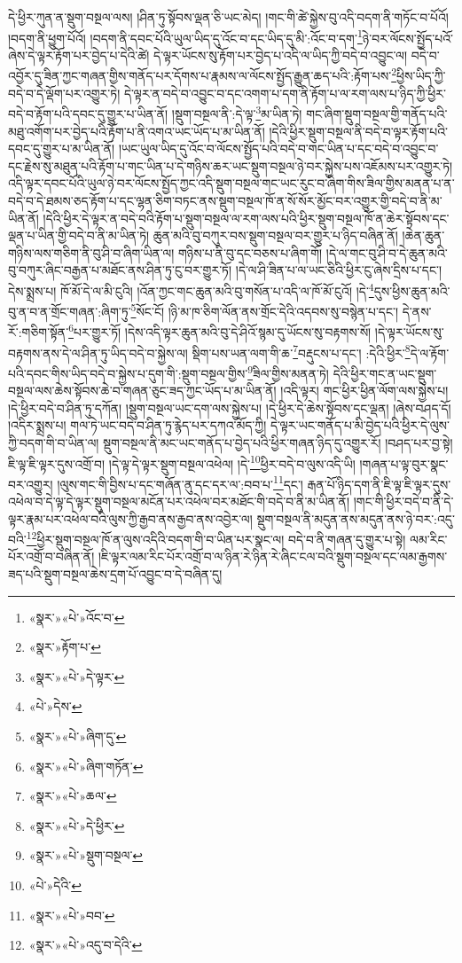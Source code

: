 དེ་ཕྱིར་ཀུན་ན་སྡུག་བསྔལ་ལས། །ཤིན་ཏུ་སྟོབས་ལྡན་ཅི་ཡང་མེད། །གང་གི་ཚེ་སྐྱེས་བུ་འདི་བདག་ནི་གཏོང་བ་པོའོ། །བདག་ནི་ཕྱུག་པོའོ། །བདག་ནི་དབང་པོའི་ཡུལ་ཡིད་དུ་འོང་བ་དང་ཡིད་དུ་མི་:འོང་བ་དག་\footnote{«སྣར་»«པེ་»འོང་བ་}ཉེ་བར་ལོངས་སྤྱོད་པའོ་ཞེས་དེ་ལྟར་རྟོག་པར་བྱེད་པ་དེའི་ཚེ། དེ་ལྟར་ཡོངས་སུ་རྟོག་པར་བྱེད་པ་འདི་ལ་ཡིད་ཀྱི་བདེ་བ་འབྱུང་ལ། བདེ་བ་འབྱོར་དུ་ཟིན་ཀྱང་གཞན་གྱིས་གནོད་པར་དོགས་པ་རྣམས་ལ་ལོངས་སྤྱོད་རྒྱུན་ཆད་པའི་:རྟོག་པས་\footnote{«སྣར་»རྟོག་པ་}ཕྱིས་ཡིད་ཀྱི་བདེ་བ་དེ་ལྡོག་པར་འགྱུར་ཏེ། དེ་ལྟར་ན་བདེ་བ་འབྱུང་བ་དང་འགག་པ་དག་ནི་རྟོག་པ་ལ་རག་ལས་པ་ཉིད་ཀྱི་ཕྱིར་བདེ་བ་རྟོག་པའི་དབང་དུ་གྱུར་པ་ཡིན་ནོ། །སྡུག་བསྔལ་ནི་:དེ་ལྟ་\footnote{«སྣར་»«པེ་»དེ་ལྟར་}མ་ཡིན་ཏེ། གང་ཞིག་སྡུག་བསྔལ་གྱི་གནོད་པའི་མཐུ་འགོག་པར་བྱེད་པའི་རྟོག་པ་ནི་འགའ་ཡང་ཡོད་པ་མ་ཡིན་ནོ། །དེའི་ཕྱིར་སྡུག་བསྔལ་ནི་བདེ་བ་ལྟར་རྟོག་པའི་དབང་དུ་གྱུར་པ་མ་ཡིན་ནོ། །ཡང་ཡུལ་ཡིད་དུ་འོང་བ་ལོངས་སྤྱོད་པའི་བདེ་བ་གང་ཡིན་པ་དང་བདེ་བ་འབྱུང་བ་དང་རྗེས་སུ་མཐུན་པའི་རྟོག་པ་གང་ཡིན་པ་དེ་གཉིས་ཆར་ཡང་སྡུག་བསྔལ་ཉེ་བར་སྐྱེས་པས་འཇོམས་པར་འགྱུར་ཏེ། འདི་ལྟར་དབང་པོའི་ཡུལ་ཉེ་བར་ལོངས་སྤྱོད་ཀྱང་འདི་སྡུག་བསྔལ་གང་ཡང་རུང་བ་ཞིག་གིས་ཟིལ་གྱིས་མནན་པ་ན་བདེ་བ་དེ་ཐམས་ཅད་རྟོག་པ་དང་ལྷན་ཅིག་བཏང་ནས་སྡུག་བསྔལ་ཁོ་ན་སོ་སོར་མྱོང་བར་འགྱུར་གྱི་བདེ་བ་ནི་མ་ཡིན་ནོ། །དེའི་ཕྱིར་དེ་ལྟར་ན་བདེ་བའི་རྟོག་པ་སྡུག་བསྔལ་ལ་རག་ལས་པའི་ཕྱིར་སྡུག་བསྔལ་ཁོ་ན་ཆེར་སྟོབས་དང་ལྡན་པ་ཡིན་གྱི་བདེ་བ་ནི་མ་ཡིན་ཏེ། ཆུན་མའི་བུ་བཀུར་བས་སྡུག་བསྔལ་བར་གྱུར་པ་ཉིད་བཞིན་ནོ། །ཆེན་ཆུན་གཉིས་ལས་གཅིག་ནི་བུ་ཤི་བ་ཞིག་ཡིན་ལ། གཉིས་པ་ནི་བུ་དང་བཅས་པ་ཞིག་གོ། །དེ་ལ་གང་བུ་ཤི་བ་དེ་ཆུན་མའི་བུ་བཀུར་ཞིང་བརྒྱན་པ་མཐོང་ནས་ཤིན་ཏུ་ངུ་བར་གྱུར་ཏོ། །དེ་ལ་ཤི་ཟིན་པ་ལ་ཡང་ཅིའི་ཕྱིར་ངུ་ཞེས་དྲིས་པ་དང་། དེས་སྨྲས་པ། ཁོ་མོ་དེ་ལ་མི་ངུའི། །འོན་ཀྱང་གང་ཆུན་མའི་བུ་གསོན་པ་འདི་ལ་ཁོ་མོ་ངུའོ། །དེ་\footnote{«པེ་»དེས་}དུས་ཕྱིས་ཆུན་མའི་བུ་ན་བ་ན་གྲོང་གཞན་:ཞིག་ཏུ་\footnote{«སྣར་»«པེ་»ཞིག་དུ་}སོང་ངོ། །ཉི་མ་ཁ་ཅིག་ལོན་ནས་གྲོང་དེའི་འདབས་སུ་བསྙེན་པ་དང་། དེ་ནས་རོ་:གཅིག་སྟོན་\footnote{«སྣར་»«པེ་»ཞིག་གཏོན་}པར་གྱུར་ཏོ། །དེས་འདི་ལྟར་ཆུན་མའི་བུ་དེ་ཤིའོ་སྙམ་དུ་ཡོངས་སུ་བརྟགས་སོ། །དེ་ལྟར་ཡོངས་སུ་བརྟགས་ནས་དེ་ལ་ཤིན་ཏུ་ཡིད་བདེ་བ་སྐྱེས་ལ། སྡིག་པས་ཡན་ལག་གི་ཆ་\footnote{«སྣར་»«པེ་»ཆལ་}བརྡུངས་པ་དང་། :དེའི་ཕྱིར་\footnote{«སྣར་»«པེ་»དེ་ཕྱིར་}དེ་ལ་རྟོག་པའི་དབང་གིས་ཡིད་བདེ་བ་སྐྱེས་པ་དུག་གི་:སྡུག་བསྔལ་གྱིས་\footnote{«སྣར་»«པེ་»སྡུག་བསྔལ་}ཟིལ་གྱིས་མནན་ཏེ། དེའི་ཕྱིར་གང་ན་ཡང་སྡུག་བསྔལ་ལས་ཆེས་སྟོབས་ཆེ་བ་གཞན་ཅུང་ཟད་ཀྱང་ཡོད་པ་མ་ཡིན་ནོ། །འདི་ལྟར། གང་ཕྱིར་ཕྱིན་ལོག་ལས་སྐྱེས་པ། །དེ་ཕྱིར་བདེ་བ་ཤིན་ཏུ་དཀོན། །སྡུག་བསྔལ་ཡང་དག་ལས་སྐྱེས་པ། །དེ་ཕྱིར་དེ་ཆེས་སྟོབས་དང་ལྡན། །ཞེས་བཤད་དོ། །འདིར་སྨྲས་པ། གལ་ཏེ་ཡང་བདེ་བ་ཤིན་ཏུ་རྙེད་པར་དཀའ་མོད་ཀྱི། དེ་ལྟར་ཡང་གནོད་པ་མི་བྱེད་པའི་ཕྱིར་དེ་ལུས་ཀྱི་བདག་གི་བ་ཡིན་ལ། སྡུག་བསྔལ་ནི་མང་ཡང་གནོད་པ་བྱེད་པའི་ཕྱིར་གཞན་ཉིད་དུ་འགྱུར་རོ། །བཤད་པར་བྱ་སྟེ། ཇི་ལྟ་ཇི་ལྟར་དུས་འགྲོ་བ། །དེ་ལྟ་དེ་ལྟར་སྡུག་བསྔལ་འཕེལ། །དེ་\footnote{«པེ་»དེའི་}ཕྱིར་བདེ་བ་ལུས་འདི་ཡི། །གཞན་པ་ལྟ་བུར་སྣང་བར་འགྱུར། །ལུས་གང་གི་བྱིས་པ་དང་གཞོན་ནུ་དང་དར་ལ་:བབ་པ་\footnote{«སྣར་»«པེ་»བབ་}དང་། རྒན་པོ་ཉིད་དག་ནི་ཇི་ལྟ་ཇི་ལྟར་དུས་འཕེལ་བ་དེ་ལྟ་དེ་ལྟར་སྡུག་བསྔལ་མངོན་པར་འཕེལ་བར་མཐོང་གི་བདེ་བ་ནི་མ་ཡིན་ནོ། །གང་གི་ཕྱིར་བདེ་བ་ནི་དེ་ལྟར་རྣམ་པར་འཕེལ་བའི་ལུས་ཀྱི་རྒྱབ་ནས་རྒྱབ་ནས་འབྱེར་ལ། སྡུག་བསྔལ་ནི་མདུན་ནས་མདུན་ནས་ཉེ་བར་:འདུ་བའི་\footnote{«སྣར་»«པེ་»འདུ་བ་དེའི་}ཕྱིར་སྡུག་བསྔལ་ཁོ་ན་ལུས་འདིའི་བདག་གི་བ་ཡིན་པར་སྣང་ལ། བདེ་བ་ནི་གཞན་དུ་གྱུར་པ་སྟེ། ལམ་རིང་པོར་འགྲོ་བ་བཞིན་ནོ། །ཇི་ལྟར་ལམ་རིང་པོར་འགྲོ་བ་ལ་ཉིན་རེ་ཉིན་རེ་ཞིང་ངལ་བའི་སྡུག་བསྔལ་དང་ལམ་རྒྱགས་ཟད་པའི་སྡུག་བསྔལ་ཆེས་དྲག་པོ་འབྱུང་བ་དེ་བཞིན་དུ། 